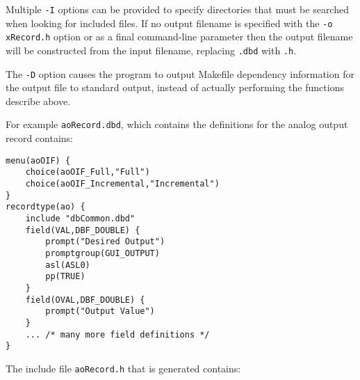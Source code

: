 Multiple \verb|-I| options can be provided to specify directories that must be searched when looking for included files.
If no output filename is specified with the \verb|-o xRecord.h| option or as a final command-line parameter then the output filename will be constructed from the input filename, replacing \verb|.dbd| with \verb|.h|.

The \verb|-D| option causes the program to output Makefile dependency information for the output file to standard output, instead of actually performing the functions describe above.

For example \verb|aoRecord.dbd|, which contains the definitions for the analog output record contains:

\begin{lstlisting}[language=dbd]
menu(aoOIF) {
    choice(aoOIF_Full,"Full")
    choice(aoOIF_Incremental,"Incremental")
}
recordtype(ao) {
    include "dbCommon.dbd" 
    field(VAL,DBF_DOUBLE) {
        prompt("Desired Output")
        promptgroup(GUI_OUTPUT)
        asl(ASL0)
        pp(TRUE)
    }
    field(OVAL,DBF_DOUBLE) {
        prompt("Output Value")
    }
    ... /* many more field definitions */
}
\end{lstlisting}

The include file \verb|aoRecord.h| that is generated contains:

